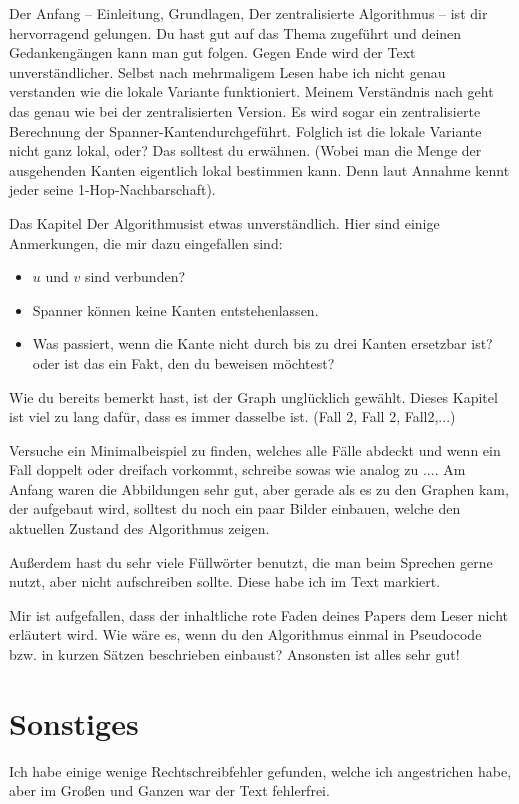 \documentclass[a4paper,twoside]{IEEEtran}
\begin{document}
Der Anfang -- Einleitung, Grundlagen, Der zentralisierte Algorithmus -- ist dir hervorragend gelungen.
Du hast gut auf das Thema zugeführt und deinen Gedankengängen kann man gut folgen.
Gegen Ende wird der Text unverständlicher. 
Selbst nach mehrmaligem Lesen habe ich nicht genau verstanden wie die lokale Variante funktioniert.
Meinem Verständnis nach geht das genau wie bei der zentralisierten Version.
Es wird sogar ein \glqq zentralisierte Berechnung der Spanner-Kanten\grqq \space durchgeführt.
Folglich ist die lokale Variante nicht ganz lokal, oder?
Das solltest du erwähnen.
(Wobei man die Menge der ausgehenden Kanten eigentlich lokal bestimmen kann.
Denn laut Annahme kennt jeder seine 1-Hop-Nachbarschaft).

Das Kapitel \glqq Der Algorithmus\grqq \space ist etwas unverständlich. 
Hier sind einige Anmerkungen, die mir dazu eingefallen sind:
\begin{itemize}
\item $u $ und $v $ sind verbunden?
\item Spanner können keine Kanten  \glqq entstehen\grqq \space lassen.
\item Was passiert, wenn die Kante nicht \glqq durch bis zu drei Kanten ersetzbar ist?\grqq   \space oder ist das ein Fakt, den du beweisen möchtest?
\end{itemize}

Wie du bereits bemerkt hast, ist der Graph unglücklich gewählt.
Dieses Kapitel ist viel zu lang dafür, dass es immer dasselbe ist. (Fall 2, Fall 2, Fall2,...)

Versuche ein Minimalbeispiel zu finden, welches alle Fälle abdeckt und wenn ein Fall doppelt oder dreifach vorkommt, schreibe sowas wie \glqq analog zu ...\grqq. \space
Am Anfang waren die Abbildungen sehr gut, aber gerade als es zu den Graphen kam, der aufgebaut wird, solltest du noch ein paar Bilder einbauen, welche den aktuellen Zustand des Algorithmus zeigen.


Außerdem hast du sehr viele Füllwörter benutzt, die man beim Sprechen gerne nutzt, aber nicht aufschreiben sollte.
Diese habe ich im Text markiert.

Mir ist aufgefallen, dass der inhaltliche rote Faden deines Papers dem Leser nicht erläutert wird.
Wie wäre es, wenn du den Algorithmus einmal in Pseudocode bzw. in kurzen Sätzen beschrieben einbaust?
Ansonsten ist alles sehr gut!





\section{Sonstiges}
Ich habe einige wenige Rechtschreibfehler gefunden, welche ich angestrichen habe, aber im Großen und Ganzen war der Text fehlerfrei.
\end{document}
